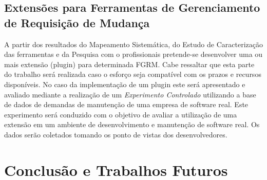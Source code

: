 \documentclass[msc,proposal,hidelot,hideabstract]{ppgccufmg} %
\begin{document}
\section{Extensões para Ferramentas de Gerenciamento de Requisição de Mudança}
\label{sec:novas-extensoes}

A partir dos resultados do Mapeamento Sistemática, do Estudo de Caracterização das ferramentas e da Pesquisa com o profissionais pretende-se desenvolver uma ou mais extensão (plugin) para determinada FGRM. Cabe ressaltar que esta parte do trabalho será realizada caso o esforço seja compatível com os prazos e recursos disponíveis. No caso da implementação de um plugin este será apresentado e avaliado mediante a realização de um \textit{Experimento Controlado} \cite{wohlin2012experimentation} utilizando a base de dados de demandas de manutenção de uma empresa de software real. Este experimento será conduzido com o objetivo de avaliar a utilização de uma extensão em um ambiente de desenvolvimento e manutenção de software real. Os dados serão coletados tomando os ponto de vistas dos desenvolvedores.

\chapter{Conclusão e Trabalhos Futuros}
\label{ch:conclusao_trab_futuros}
\end{document}
